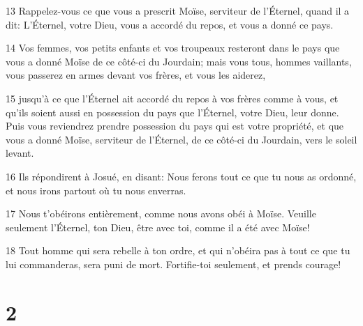 \par 13 Rappelez-vous ce que vous a prescrit Moïse, serviteur de l'Éternel, quand il a dit: L'Éternel, votre Dieu, vous a accordé du repos, et vous a donné ce pays.
\par 14 Vos femmes, vos petits enfants et vos troupeaux resteront dans le pays que vous a donné Moïse de ce côté-ci du Jourdain; mais vous tous, hommes vaillants, vous passerez en armes devant vos frères, et vous les aiderez,
\par 15 jusqu'à ce que l'Éternel ait accordé du repos à vos frères comme à vous, et qu'ils soient aussi en possession du pays que l'Éternel, votre Dieu, leur donne. Puis vous reviendrez prendre possession du pays qui est votre propriété, et que vous a donné Moïse, serviteur de l'Éternel, de ce côté-ci du Jourdain, vers le soleil levant.
\par 16 Ils répondirent à Josué, en disant: Nous ferons tout ce que tu nous as ordonné, et nous irons partout où tu nous enverras.
\par 17 Nous t'obéirons entièrement, comme nous avons obéi à Moïse. Veuille seulement l'Éternel, ton Dieu, être avec toi, comme il a été avec Moïse!
\par 18 Tout homme qui sera rebelle à ton ordre, et qui n'obéira pas à tout ce que tu lui commanderas, sera puni de mort. Fortifie-toi seulement, et prends courage!

\chapter{2}


